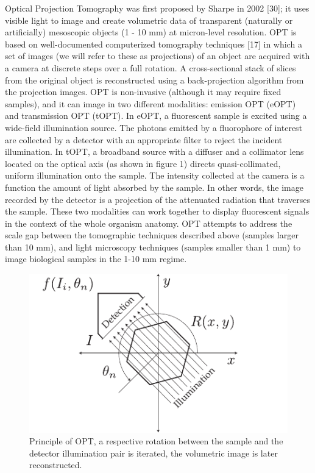 Optical Projection Tomography was first proposed by Sharpe in 2002 [30]; it uses visible light to image and create volumetric data of transparent (naturally or artificially) mesoscopic objects (1 - 10 mm) at micron-level resolution.
OPT is based on well-documented computerized tomography techniques [17] in which a set of images (we will refer to these as projections) of an object are acquired with a camera at discrete steps over a full rotation.
A cross-sectional stack of slices from the original object is reconstructed using a back-projection algorithm from the projection images.
OPT is non-invasive (although it may require fixed samples), and it can image in two different modalities: emission OPT (eOPT) and transmission OPT (tOPT).
In eOPT, a fluorescent sample is excited using a wide-field illumination source.
The photons emitted by a fluorophore of interest are collected by a detector with an appropriate filter to reject the incident illumination.
In tOPT, a broadband source with a diffuser and a collimator lens located on the optical axis (as shown in figure 1) directs quasi-collimated, uniform illumination onto the sample.
The intensity collected at the camera is a function the amount of light absorbed by the sample.
In other words, the image recorded by the detector is a projection of the attenuated radiation that traverses the sample.
These two modalities can work together to display fluorescent signals in the context of the whole organism anatomy.
OPT attempts to address the scale gap between the tomographic techniques described above (samples larger than 10 mm), and light microscopy techniques (samples smaller than 1 mm) to image biological samples in the 1-10 mm regime.

\begin{figure}
  \centering
  \includegraphics{Chapters/flopt/Figs/PDF/OPT_digram}
  \caption{Principle of OPT, a respective rotation between the sample and the detector illumination pair is iterated, the volumetric image is later reconstructed.}
\end{figure}

